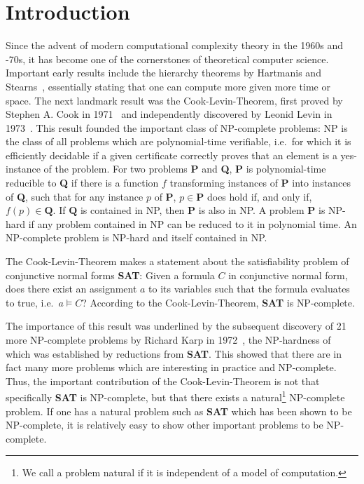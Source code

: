 \chapter{Introduction}\label{chap:introduction}
\newcommand{\SAT}{\textbf{SAT}}
\newcommand{\Clique}{\textbf{Clique}}
\newcommand{\NP}{\textsf{NP}}
\newcommand{\PC}{\textsf{P}}

\newcommand{\PR}{\textbf{PR}}

Since the advent of modern computational complexity theory in the 1960s and -70s, it has become one of the cornerstones of theoretical computer science. 
Important early results include the hierarchy theorems by Hartmanis and Stearns~\cite{hartmanis_stearns}, essentially stating that one can compute more given more time or space. 
The next landmark result was the Cook-Levin-Theorem, first proved by Stephen A. Cook in 1971~\cite{cook_theorem} and independently discovered by Leonid Levin in 1973~\cite{levin_theorem}. 
This result founded the important class of \NP{}-complete problems: \NP{} is the class of all problems which are polynomial-time verifiable, i.e.\ for which it is efficiently decidable if a given certificate correctly proves that an element is a yes-instance of the problem. For two problems \textbf{P} and \textbf{Q}, \textbf{P} is polynomial-time reducible to \textbf{Q} if there is a function $f$ transforming instances of \textbf{P} into instances of \textbf{Q}, such that for any instance $p$ of \textbf{P}, $p \in \textbf{P}$ does hold if, and only if, $f(p) \in \textbf{Q}$. 
If $\textbf{Q}$ is contained in \NP{}, then $\textbf{P}$ is also in \NP{}.
A problem \textbf{P} is \NP{}-hard if any problem contained in \NP{} can be reduced to it in polynomial time. An \NP{}-complete problem is \NP{}-hard and itself contained in \NP{}.  

The Cook-Levin-Theorem makes a statement about the satisfiability problem of conjunctive normal forms \SAT{}: 
Given a formula $C$ in conjunctive normal form, does there exist an assignment $a$ to its variables such that the formula evaluates to \textsf{true}, i.e.\ $a \models C$?
According to the Cook-Levin-Theorem, \SAT{} is \NP{}-complete. 

The importance of this result was underlined by the subsequent discovery of 21 more \NP{}-complete problems by Richard Karp in 1972~\cite{Karp1972}, the \NP{}-hardness of which was established by reductions from \textbf{SAT}. This showed that there are in fact many more problems which are interesting in practice and \NP{}-complete. 
Thus, the important contribution of the Cook-Levin-Theorem is not that specifically \SAT{} is \NP{}-complete, but that there exists a natural\footnote{We call a problem natural if it is independent of a model of computation.} \NP{}-complete problem. If one has a natural problem such as \SAT{} which has been shown to be \NP{}-complete, it is relatively easy to show other important problems to be \NP{}-complete.

